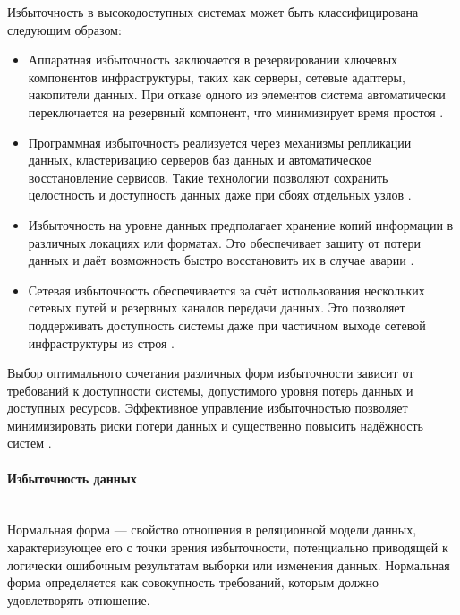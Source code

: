 Избыточность в высокодоступных системах может быть классифицирована следующим образом:

\begin{itemize}
    \item Аппаратная избыточность заключается в резервировании ключевых компонентов инфраструктуры, таких как серверы, сетевые адаптеры, накопители данных. При отказе одного из элементов система автоматически переключается на резервный компонент, что минимизирует время простоя \autocites{RajeshKumar}{heycoachHAA}.
    \item Программная избыточность реализуется через механизмы репликации данных, кластеризацию серверов баз данных и автоматическое восстановление сервисов. Такие технологии позволяют сохранить целостность и доступность данных даже при сбоях отдельных узлов \autocite{OszuValduriez}.
    \item Избыточность на уровне данных предполагает хранение копий информации в различных локациях или форматах. Это обеспечивает защиту от потери данных и даёт возможность быстро восстановить их в случае аварии \autocite{Kleppmann}.
    \item Сетевая избыточность обеспечивается за счёт использования нескольких сетевых путей и резервных каналов передачи данных. Это позволяет поддерживать доступность системы даже при частичном выходе сетевой инфраструктуры из строя \autocites{RajeshKumar}{heycoachHAA}.
\end{itemize}
Выбор оптимального сочетания различных форм избыточности зависит от требований к доступности системы, допустимого уровня потерь данных и доступных ресурсов. Эффективное управление избыточностью позволяет минимизировать риски потери данных и существенно повысить надёжность систем \autocite{OszuValduriez}.

\paragraph{Избыточность данных} ~\\
Нормальная форма — свойство отношения в реляционной модели данных, характеризующее его с точки зрения избыточности, потенциально приводящей к логически ошибочным результатам выборки или изменения данных. Нормальная форма определяется как совокупность требований, которым должно удовлетворять отношение.

